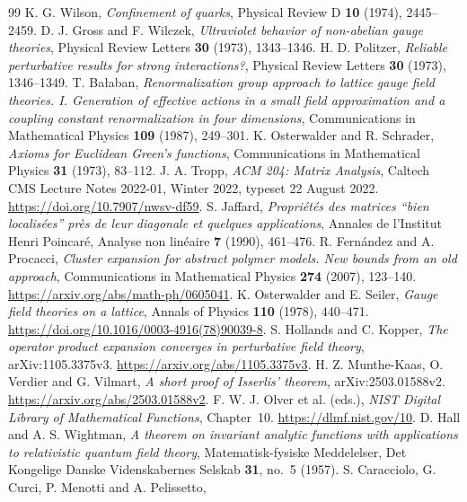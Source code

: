 \begin{thebibliography}{99}
 K. G. Wilson,
\emph{Confinement of quarks},
Physical Review D \textbf{10} (1974), 2445--2459.
 D. J. Gross and F. Wilczek,
\emph{Ultraviolet behavior of non-abelian gauge theories},
Physical Review Letters \textbf{30} (1973), 1343--1346.
 H. D. Politzer,
\emph{Reliable perturbative results for strong interactions?},
Physical Review Letters \textbf{30} (1973), 1346--1349.
 T. Ba\l{}aban,
\emph{Renormalization group approach to lattice gauge field theories. I.
Generation of effective actions in a small field approximation and a
coupling constant renormalization in four dimensions},
Communications in Mathematical Physics \textbf{109} (1987), 249--301.
 K. Osterwalder and R. Schrader,
\emph{Axioms for Euclidean Green's functions},
Communications in Mathematical Physics \textbf{31} (1973), 83--112.
 J. A. Tropp,
\emph{ACM 204: Matrix Analysis}, Caltech CMS Lecture Notes 2022-01,
Winter 2022, typeset 22 August 2022.
\url{https://doi.org/10.7907/nwsv-df59}.
 S. Jaffard,
\emph{Propri\'et\'es des matrices ``bien localis\'ees'' pr\`es de leur
 diagonale et quelques applications},
Annales de l'Institut Henri Poincar\'e, Analyse non lin\'eaire
\textbf{7} (1990), 461--476.
 R. Fern\'andez and A. Procacci,
\emph{Cluster expansion for abstract polymer models. New bounds from an old approach},
Communications in Mathematical Physics \textbf{274} (2007), 123--140.
\url{https://arxiv.org/abs/math-ph/0605041}.
 K. Osterwalder and E. Seiler,
\emph{Gauge field theories on a lattice},
Annals of Physics \textbf{110} (1978), 440--471.
\url{https://doi.org/10.1016/0003-4916(78)90039-8}.
 S. Hollands and C. Kopper,
\emph{The operator product expansion converges in perturbative field theory},
arXiv:1105.3375v3.
\url{https://arxiv.org/abs/1105.3375v3}.
 H. Z. Munthe-Kaas, O. Verdier and G. Vilmart,
\emph{A short proof of Isserlis' theorem}, arXiv:2503.01588v2.
\url{https://arxiv.org/abs/2503.01588v2}.
 F. W. J. Olver et al. (eds.),
\emph{NIST Digital Library of Mathematical Functions}, Chapter~10.
\url{https://dlmf.nist.gov/10}.
 D. Hall and A. S. Wightman,
\emph{A theorem on invariant analytic functions with applications to
relativistic quantum field theory},
Matematisk-fysiske Meddelelser, Det Kongelige Danske Videnskabernes
Selskab \textbf{31}, no.~5 (1957).
 S. Caracciolo, G. Curci, P. Menotti and A. Pelissetto,

\end{thebibliography}
